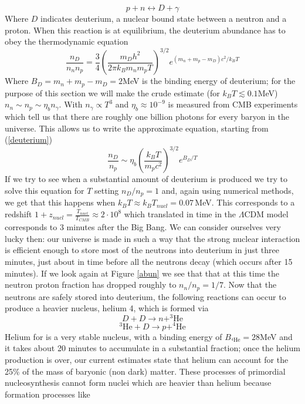 \documentclass[11pt, a4paper,oneside,openright]{book}
\numberwithin{equation}{section}
\begin{document}
\begin{equation}
p+n\leftrightarrow D + \gamma
\end{equation}
Where $D$ indicates deuterium, a nuclear bound state between a neutron and a proton. When this reaction is at equilibrium, the deuterium abundance has to obey the thermodynamic equation
\begin{equation}
\label{deuterium}
\frac{n_D}{n_nn_p}=\frac{3}{4}\left(\frac{m_Dh^2}{2\pi k_Bm_nm_p T}\right)^{3/2}e^{(m_n+m_p-m_D)c^2/k_BT}
\end{equation}
Where $B_D=m_n+m_p-m_D=2$MeV is the binding energy of deuterium; for the purpose of this section we will make the crude estimate (for $k_BT\lesssim 0.1$MeV) $n_n\sim n_p \sim\eta_b n_\gamma$. With $n_\gamma \propto T^3$ and $\eta_b\approx 10^{-9}$ is measured from CMB experiments which tell us that there are roughly one billion photons for every baryon in the universe. This allows us to write the approximate equation, starting from (\ref{deuterium})
\begin{equation}
\frac{n_D}{n_p}\sim \eta_b\left(\frac{k_B T}{m_p c^2}\right)^{3/2}e^{B_D/T}
\end{equation}
If we try to see when a substantial amount of deuterium is produced we try to solve this equation for $T$ setting $n_D/n_p=1$ and, again using numerical methods, we get that this happens when $k_B T\approx k_B T_{nucl}=0.07$\,MeV. This corresponds to a redshift $1+z_{nucl}=\frac{T_{nucl}}{T_{CMB}}\approx 2\cdot 10^8$ which translated in time in the $\Lambda$CDM model corresponds to 3 minutes after the Big Bang. We can consider ourselves very lucky then: our universe is made in such a way that the strong nuclear interaction is efficient enough to store most of the neutrons into deuterium in just three minutes, just about in time before all the neutrons decay (which occurs after 15 minutes). If we look again at Figure \ref{abun} we see that that at this time the neutron proton fraction has dropped roughly to $n_n/n_p=1/7$. Now that the neutrons are safely stored into deuterium, the following reactions can occur to produce a heavier nucleus, helium 4, which is formed via
\begin{equation}
D+D \rightarrow n + ^3\mathrm{He}
\end{equation}
\begin{equation}
^3\mathrm{He}+D \rightarrow p + ^4\mathrm{He}
\end{equation}
Helium for is a very stable nucleus, with a binding energy of $B_{^4\mathrm{He}}=28$MeV and it takes about 20 minutes to accumulate in a substantial fraction; once the helium production is over, our current estimates state that helium can account for the 25\% of the mass of baryonic (non dark) matter. These processes of primordial nucleosynthesis cannot form nuclei which are heavier than helium because formation processes like 
\end{document}
